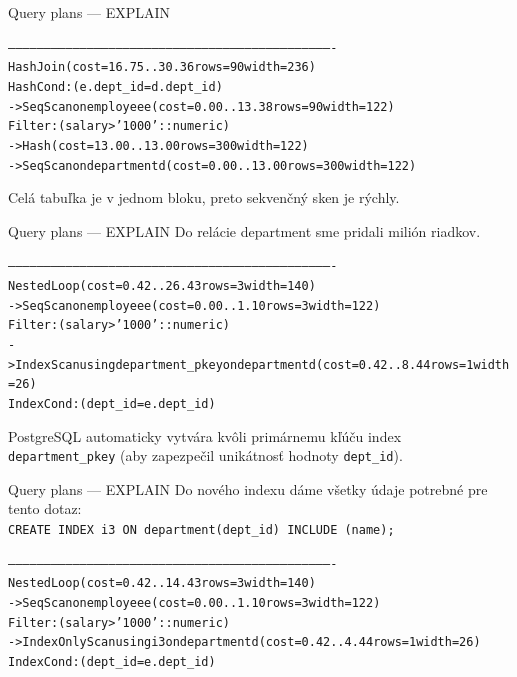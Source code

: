 \documentclass[12pt]{beamer}
\begin{document}
\begin{frame}[fragile]{Query plans --- EXPLAIN}
\hbox{}{
\scriptsize
\begin{alltt}
----------------------------------------------------------------------------------------------------------------------------------------
Hash Join  (cost=16.75..30.36 rows=90 width=236)
Hash Cond: (e.dept_id = d.dept_id)
  ->  Seq Scan on employee e  (cost=0.00..13.38 rows=90 width=122)
        Filter: (salary > '1000'::numeric)
  ->  Hash  (cost=13.00..13.00 rows=300 width=122)
        ->  Seq Scan on department d  (cost=0.00..13.00 rows=300 width=122)
\end{alltt}
}
Celá tabuľka je v jednom bloku, preto sekvenčný sken je rýchly.
\end{frame}

\begin{frame}[fragile]{Query plans --- EXPLAIN}
Do relácie department sme pridali milión riadkov.
{
\scriptsize
\begin{alltt}
----------------------------------------------------------------------------------------------------------------------------------------
Nested Loop  (cost=0.42..26.43 rows=3 width=140)
  ->  Seq Scan on employee e  (cost=0.00..1.10 rows=3 width=122)
        Filter: (salary > '1000'::numeric)
  ->  Index Scan using department_pkey on department d  (cost=0.42..8.44 rows=1 width=26)
        Index Cond: (dept_id = e.dept_id)
\end{alltt}
}
PostgreSQL automaticky vytvára kvôli primárnemu kľúču index \verb|department_pkey| (aby zapezpečil unikátnosť hodnoty \verb|dept_id|).
\end{frame}

\begin{frame}[fragile]{Query plans --- EXPLAIN}
Do nového indexu dáme všetky údaje potrebné pre tento dotaz:\\[3mm]
\verb|CREATE INDEX i3 ON department(dept_id) INCLUDE (name);|
\scriptsize
\begin{alltt}
----------------------------------------------------------------------------------------------------------------------------------------
Nested Loop  (cost=0.42..14.43 rows=3 width=140)
  ->  Seq Scan on employee e  (cost=0.00..1.10 rows=3 width=122)
        Filter: (salary > '1000'::numeric)
  ->  Index Only Scan using i3 on department d  (cost=0.42..4.44 rows=1 width=26)
        Index Cond: (dept_id = e.dept_id)
\end{alltt}
\end{frame}
\end{document}

